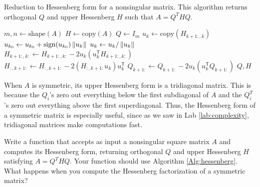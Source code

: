 \begin{algorithm}
\caption{Reduction to Hessenberg form for a nonsingular matrix. 
This algorithm returns orthogonal $Q$ and upper Hessenberg $H$ such that $A = Q^THQ$.}
\label{Alg:Hessenberg}
\begin{algorithmic}[1]
\State $m, n \gets \text{shape}(A)$
\State $H \gets \text{copy}(A)$
\State $Q \gets I_m$
    \State $u_k \gets \text{copy}\left(H_{k+1:, k}\right)$
    \State $u_{k_0} \gets u_{k_0} + \text{sign}(u_{k_0}) \left\lVert u_k\right\rVert$
    \State $u_k \gets u_k/\left\lVert u_k\right\rVert$
    \State $H_{k+1:,k:} \gets H_{k+1:,k:} - 2u_k(u_k^\mathsf{T} H_{k+1:,k:})$
    \State $H_{:,k+1:} \gets H_{:,k+1:} - 2(H_{:,k+1:} u_k) u_k^\mathsf{T}$
    \State $Q_{k+1:} \gets Q_{k+1:} - 2u_k(u_k^\mathsf{T} Q_{k+1:})$
\EndFor
\State {} $Q, H$
\EndProcedure
\end{algorithmic}
\end{algorithm}

When $A$ is symmetric, its upper Hessenberg form is a tridiagonal matrix. 
This is because the $Q_i$'s zero out everything below the first subdiagonal of $A$ and the $Q_i^T$'s zero out everything above the first superdiagonal.
Thus, the Hessenberg form of a symmetric matrix is especially useful, since as we saw in Lab \ref{lab:complexity}, tridiagonal matrices make computations fast.




\begin{problem}
\label{prob:hessenberg}
Write a function that accepts as input a nonsingular square matrix $A$ and computes its Hessenberg form, returning orthogonal $Q$ and upper Hessenberg $H$ satisfying $A = Q^THQ$. 
Your function should use Algorithm \ref{Alg:hessenberg}. 
What happens when you compute the Hessenberg factorization of a symmetric matrix?
\end{problem}


